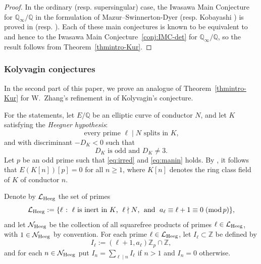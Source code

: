 \documentclass[10pt,reqno]{amsart}
\numberwithin{equation}{section}
\theoremstyle{plain}
\theoremstyle{definition}
\theoremstyle{definition}
\theoremstyle{plain}
\theoremstyle{plain}
\theoremstyle{plain}
\theoremstyle{plain}
\theoremstyle{plain}
\theoremstyle{plain}
\newcommand{\Z}{\mathbb{Z}}
\newcommand{\Q}{\mathbb{Q}}
\begin{document}
\begin{proof}
In the ordinary (resp. supersingular) case, the Iwasawa Main Conjecture for $\Q_\infty/\Q$ in the formulation of Mazur--Swinnerton-Dyer  \cite{mazur-towers,M-SwD} (resp. Kobayashi \cite{kobayashi-ss}) is proved in \cite{wan-hilbert,BCS} (resp. \cite{CLW,BSTW}). Each of these main  conjectures is known to be equivalent to \cite[Conj.~12.10]{kato-euler-systems} and hence to the Iwasawa Main Conjecture~\ref{conj:IMC-det} for $\Q_\infty/\Q$, so the result follows from Theorem~\ref{thmintro-Kur}.
\end{proof}


\subsubsection{Kolyvagin conjectures}\label{subsec:Kolyvagin}

In the %
second part of this paper, we prove an analogue of Theorem~\ref{thmintro-Kur} for W.~Zhang's refinement in \cite{zhang-CDM} of Kolyvagin's conjecture. 

For the statements, let $E/\Q$ be an elliptic curve of conductor $N$, and let $K$ satisfying the \emph{Heegner hypothesis}:
\begin{equation}\label{eq:Heeg}
\textrm{every prime $\ell\mid N$ splits in $K$,}\tag{Heeg}
\end{equation} 
and with discriminant $-D_K<0$ such that
\begin{equation}\label{eq:intro-disc}
\textrm{$D_K$ is odd and $D_K\neq 3$.}\tag{disc}
\end{equation}
Let $p$ be an odd prime such that \eqref{eq:irred} and \eqref{eq:manin} holds. By \cite[Lem.~4.3]{gross-durham}, it follows that $E(K[n])[p]=0$ for all $n\geq 1$, where $K[n]$ denotes the ring class field of $K$ of conductor $n$.

Denote by $\mathcal{L}_{\rm Heeg}$ the set of primes
\[
\mathcal{L}_{\rm Heeg}:=\{\ell\;\colon\;\textrm{$\ell$ is inert in $K$,\; $\ell\nmid N$,\; and\; $a_\ell\equiv \ell+1\equiv 0\;({\rm mod}\,p)$}\},
\] 
and let $\mathcal{N}_{\rm Heeg}$ be the collection of all squarefree products of primes $\ell\in\mathcal{L}_{\rm Heeg}$, with $1\in\mathcal{N}_{\rm Heeg}$ by convention.  For each prime $\ell\in\mathcal{L}_{\rm Heeg}$, let $I_\ell\subset\Z$ be defined by
\[
I_\ell:=(\ell+1,a_\ell)\Z_p\cap\Z,
\]
and for each $n\in\mathcal{N}_{\rm Heeg}$ put $I_n=\sum_{\ell\mid n}I_\ell$ if $n>1$ and $I_n=0$ otherwise. 
\end{document}
